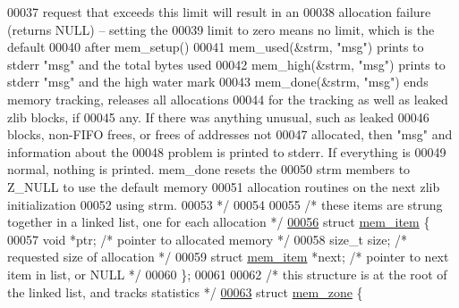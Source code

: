 \begin{DoxyCode}
00037 \textcolor{comment}{                            request that exceeds this limit will result in an}
00038 \textcolor{comment}{                            allocation failure (returns NULL) -- setting the}
00039 \textcolor{comment}{                            limit to zero means no limit, which is the default}
00040 \textcolor{comment}{                            after mem\_setup()}
00041 \textcolor{comment}{   mem\_used(&strm, "msg")   prints to stderr "msg" and the total bytes used}
00042 \textcolor{comment}{   mem\_high(&strm, "msg")   prints to stderr "msg" and the high water mark}
00043 \textcolor{comment}{   mem\_done(&strm, "msg")   ends memory tracking, releases all allocations}
00044 \textcolor{comment}{                            for the tracking as well as leaked zlib blocks, if}
00045 \textcolor{comment}{                            any.  If there was anything unusual, such as leaked}
00046 \textcolor{comment}{                            blocks, non-FIFO frees, or frees of addresses not}
00047 \textcolor{comment}{                            allocated, then "msg" and information about the}
00048 \textcolor{comment}{                            problem is printed to stderr.  If everything is}
00049 \textcolor{comment}{                            normal, nothing is printed. mem\_done resets the}
00050 \textcolor{comment}{                            strm members to Z\_NULL to use the default memory}
00051 \textcolor{comment}{                            allocation routines on the next zlib initialization}
00052 \textcolor{comment}{                            using strm.}
00053 \textcolor{comment}{ */}
00054 
00055 \textcolor{comment}{/* these items are strung together in a linked list, one for each allocation */}
\hyperlink{structmem__item}{00056} \textcolor{keyword}{struct }\hyperlink{structmem__item}{mem\_item} \{
00057     \textcolor{keywordtype}{void} *ptr;                  \textcolor{comment}{/* pointer to allocated memory */}
00058     \textcolor{keywordtype}{size\_t} size;                \textcolor{comment}{/* requested size of allocation */}
00059     \textcolor{keyword}{struct }\hyperlink{structmem__item}{mem\_item} *next;      \textcolor{comment}{/* pointer to next item in list, or NULL */}
00060 \};
00061 
00062 \textcolor{comment}{/* this structure is at the root of the linked list, and tracks statistics */}
\hyperlink{structmem__zone}{00063} \textcolor{keyword}{struct }\hyperlink{structmem__zone}{mem\_zone} \{

\end{DoxyCode}

